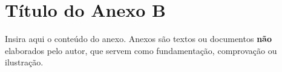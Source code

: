 
\section{Título do Anexo B}
\label{anx:anexo-b}

Insira aqui o conteúdo do anexo. Anexos são textos ou documentos
\textbf{não} elaborados pelo autor, que servem como fundamentação,
comprovação ou ilustração.